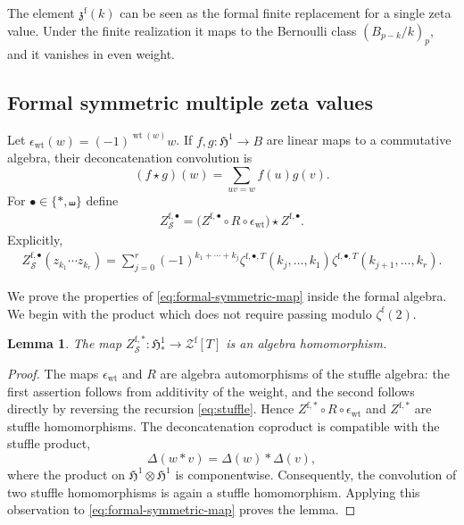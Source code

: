 \documentclass[12pt]{amsart}
\numberwithin{equation}{section}
\theoremstyle{plain}
\newtheorem{lem}[lem]{Lemma}
\DeclareMathOperator{\wt}{wt}
\newcommand{\h}{\mathfrak H}
\newcommand{\Zf}{{\mathcal Z^{\mathrm f}}}
\newcommand{\zf}[1]{\zeta^{\mathrm f}(#1)}
\newcommand{\zzf}[1]{\mathfrak z^{\mathrm f}(#1)}
\begin{document}
The element $\zzf{k}$ can be seen as the formal finite replacement for a single zeta value. Under the finite realization it maps to the Bernoulli class $(B_{p-k}/k)_p$, and it vanishes in even weight.

\subsection{Formal symmetric multiple zeta values}

Let $\epsilon_{\wt}(w)=(-1)^{\wt(w)}w$. If $f,g:\h^1\to B$ are linear maps to a commutative algebra, their deconcatenation convolution is
\[
 (f\star g)(w)=\sum_{uv=w}f(u)g(v).
\]
For $\bullet\in\{*,\shuffle\}$ define
\begin{align}\label{eq:formal-symmetric-map}
 Z_{\mathcal S}^{\mathrm f,\bullet}
 =\bigl(Z^{\mathrm f,\bullet}\circ R\circ\epsilon_{\wt}\bigr)\star Z^{\mathrm f,\bullet}.
\end{align}
Explicitly,
\begin{align}\label{eq:formal-symmetric-explicit}
 Z_{\mathcal S}^{\mathrm f,\bullet}(z_{k_1}\cdots z_{k_r})
 =\sum_{j=0}^r(-1)^{k_1+\cdots+k_j}
 \zeta^{\mathrm f,\bullet,T}(k_j,\ldots,k_1)
 \zeta^{\mathrm f,\bullet,T}(k_{j+1},\ldots,k_r).
\end{align}

We prove the properties of \eqref{eq:formal-symmetric-map} inside the formal algebra. We begin with the product which does not require passing modulo $\zf{2}$.

\begin{lem}\label{lem:formal-symmetric-stuffle}
The map $Z_{\mathcal S}^{\mathrm f,*}:\h^1_*\to\Zf[T]$ is an algebra homomorphism.
\end{lem}

\begin{proof}
The maps $\epsilon_{\wt}$ and $R$ are algebra automorphisms of the stuffle algebra: the first assertion follows from additivity of the weight, and the second follows directly by reversing the recursion \eqref{eq:stuffle}. Hence
$Z^{\mathrm f,*}\circ R\circ\epsilon_{\wt}$ and $Z^{\mathrm f,*}$ are stuffle homomorphisms. The deconcatenation coproduct is compatible with the stuffle product,
\[
 \Delta(w*v)=\Delta(w)*\Delta(v),
\]
where the product on $\h^1\otimes\h^1$ is componentwise. Consequently, the convolution of two stuffle homomorphisms is again a stuffle homomorphism. Applying this observation to \eqref{eq:formal-symmetric-map} proves the lemma.
\end{proof}
\end{document}
